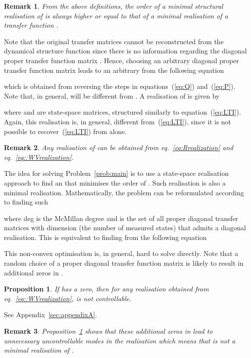 \documentclass[twocolumn,12pt]{autart}
\theoremstyle{plain}
\newtheorem{proposition}{Proposition}
\newtheorem{remark}{Remark}
\newenvironment{proof}[1][Proof]{\begin{trivlist} \item[\hskip \labelsep {\bfseries #1}]}{\end{trivlist}}
\begin{document}
\begin{remark}
From the above definitions, the order of a minimal structural realisation of  is always higher or equal to that of a minimal realisation of a transfer function . 
\end{remark}

Note that the original transfer matrices  cannot be reconstructed from the  dynamical structure function  since there is no information regarding the diagonal proper transfer function matrix . Hence, choosing an arbitrary diagonal proper transfer function matrix  leads to an arbitrary  from the following equation 
 
which is obtained from reversing the steps in equations~(\ref{eq:Q}) and~(\ref{eq:P}). Note that, in general,  will be different from .
A realisation of  is given by

where  and  are state-space matrices, structured similarly to equation~(\ref{eq:LTI}).
Again, this realisation is, in general, different from~(\ref{eq:LTI}), since it is not possible to recover~(\ref{eq:LTI}) from  alone.



\begin{remark}
Any realisation of  can be obtained from eq.~\eqref{eq:Rrealization} and eq.~\eqref{eq::WVrealization}.
\end{remark}

The idea for solving Problem~\ref{prob:main} is to use a state-space realisation approach to find an  that  minimises the order of . Such realisation is also a  minimal realisation. Mathematically, the problem can be reformulated according to finding such  

where deg is the McMillan degree \cite{zdg} and  is the set of all proper diagonal transfer matrices with dimension  (the number of measured states) that admits a diagonal realisation. This is equivalent to finding  from the following equation

This non-convex optimisation is, in general, hard to solve directly. 
Note that a random choice of a proper diagonal transfer function matrix  is likely to result in additional zeros in .
\begin{proposition}\label{prop:control}
If  has a zero, then for any realisation  obtained from eq.~\eqref{eq::WVrealization},  is not controllable.
\end{proposition}
\begin{proof}
See Appendix~\ref{sec:appendixA}.  
\end{proof}
\begin{remark}
Proposition~\ref{prop:control} shows that these additional zeros in  lead to unnecessary uncontrollable modes in the realisation  which means that 
 is not a minimal realisation of .
\end{remark}
\end{document}
